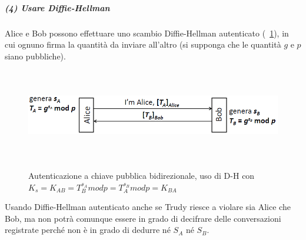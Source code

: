 \subparagraph{(4) Usare Diffie-Hellman}
Alice e Bob possono effettuare uno scambio Diffie-Hellman autenticato (\figurename~\ref{fig:ImgS77bis}), in cui ognuno firma la quantità da inviare all'altro (si supponga che le quantità $g$ e $p$ siano pubbliche).
\begin{figure}[htbp]
	\centering%
	\subfigure%
	{\includegraphics[height=4cm, width=12cm, keepaspectratio]{Immagini/autenticazione/ImgS77bis.png}}
	\caption{Autenticazione a chiave pubblica bidirezionale, uso di D-H con $K_{s} = K_{AB} = T_{B}^{s_{A}}modp = T_{A}^{s_{B}}modp = K_{BA}$}\label{fig:ImgS77bis} 	
\end{figure}
Usando Diffie-Hellman autenticato anche se Trudy riesce a violare sia Alice che Bob, ma non potrà comunque essere in grado di decifrare delle conversazioni registrate perché non è in grado di dedurre né $S_{A}$ né $S_{B}$.
